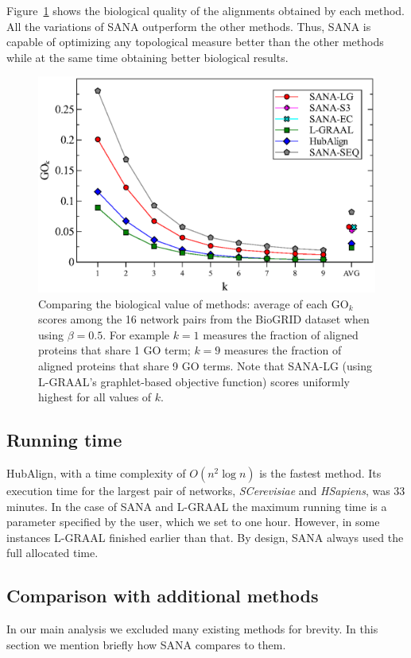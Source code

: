 \documentclass{bioinfo}
\begin{document}
Figure~\ref{fig:biogridgo} shows the biological quality of the alignments obtained by each method. All the variations of SANA outperform the other methods. Thus, SANA is capable of optimizing any topological measure better than the other methods while at the same time obtaining better biological results.

\begin{figure}
\centering
\includegraphics[width=0.99\linewidth]{biogridBeta05go.eps}
\caption{Comparing the biological value of methods: average of each $\mbox{GO}_k$ scores among the 16 network pairs from the BioGRID dataset when using $\beta=0.5$. For example $k=1$ measures the fraction of aligned proteins that share 1 GO term; $k=9$ measures the fraction of aligned proteins that share 9 GO terms. Note that SANA-LG (using L-GRAAL's graphlet-based objective function) scores uniformly highest for all values of $k$.}
\label{fig:biogridgo}
\end{figure}

\subsection{Running time}

HubAlign, with a time complexity of $O(n^2\log n)$ is the fastest method. Its execution time for the largest pair of networks, \textit{SCerevisiae} and \textit{HSapiens}, was 33 minutes. In the case of SANA and L-GRAAL the maximum running time is a parameter specified by the user, which we set to one hour. However, in some instances L-GRAAL finished earlier than that. By design, SANA always used the full allocated time.


\subsection{Comparison with additional methods}
In our main analysis we excluded many existing methods for brevity. In this section we mention briefly how SANA compares to them.
\end{document}
